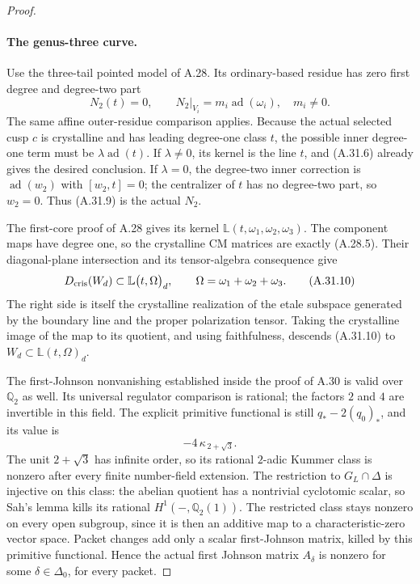 \begin{proof}
\paragraph{The genus-three curve.}
Use the three-tail pointed model of A.28.
Its ordinary-based residue has zero first degree
and degree-two part
\[
 N_2(t)=0,\qquad
 N_2|_{V_i}=m_i\operatorname{ad}(\omega_i),
                         \quad m_i\ne0.                \tag{A.31.9}
\]
The same affine outer-residue comparison applies.
Because the actual selected cusp \(c\) is crystalline
and has leading degree-one class \(t\), the possible
inner degree-one term must be
\(\lambda\operatorname{ad}(t)\).
If \(\lambda\ne0\), its kernel is the line \(t\),
and (A.31.6) already gives the desired conclusion.
If \(\lambda=0\), the degree-two inner correction
is \(\operatorname{ad}(w_2)\) with \([w_2,t]=0\);
the centralizer of \(t\) has no degree-two part,
so \(w_2=0\). Thus (A.31.9) is the actual \(N_2\).

The first-core proof of A.28 gives its kernel
\(\mathbb L(t,\omega_1,\omega_2,\omega_3)\).
The component maps have degree one, so the
crystalline CM matrices are exactly (A.28.5).
Their diagonal-plane intersection and its
tensor-algebra consequence give
\[
         D_{\rm cris}(W_d)\subset
              \mathbb L\bigl(t,\Omega\bigr)_d,
                \qquad \Omega=\omega_1+\omega_2+\omega_3 .
                                                        \tag{A.31.10}
\]
The right side is itself the crystalline realization
of the etale subspace generated by the boundary
line and the proper polarization tensor. Taking
the crystalline image of the map to its quotient,
and using faithfulness, descends (A.31.10) to
\(W_d\subset\mathbb L(t,\Omega)_d\).

The first-Johnson nonvanishing established inside
the proof of A.30 is valid over \(\mathbb Q_2\)
as well. Its universal regulator comparison is
rational; the factors \(2\) and \(4\) are invertible
in this field. The explicit primitive functional
is still \(q_*-2(q_0)_*\), and its value is
\[
                      -4\,\kappa_{\,2+\sqrt3}.
                                                        \tag{A.31.11}
\]
The unit \(2+\sqrt3\) has infinite order, so its
rational \(2\)-adic Kummer class is nonzero after
every finite number-field extension. The restriction
to \(G_L\cap\Delta\) is injective on this class:
the abelian quotient has a nontrivial cyclotomic
scalar, so Sah's lemma kills its rational
\(H^1(-,\mathbb Q_2(1))\).
The restricted class stays nonzero on every open
subgroup, since it is then an additive map to a
characteristic-zero vector space.
Packet changes add only a scalar first-Johnson
matrix, killed by this primitive functional.
Hence the actual first Johnson matrix
\(A_\delta\) is nonzero for some
\(\delta\in\Delta_0\), for every packet.


\end{proof}
